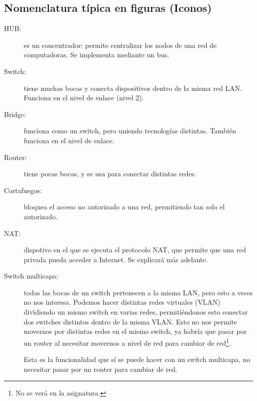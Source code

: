 \subsection{Nomenclatura típica en figuras (Iconos)}
\begin{description}
    \item[HUB:] es un concentrador: permite centralizar los nodos de una red de computadoras. Se implementa mediante un bus.
    \item[Switch:] tiene muchas bocas y conecta dispositivos dentro de la misma red \acrshort{LAN}. Funciona en el nivel de enlace (nivel 2).
    \item[Bridge:] funciona como un switch, pero uniendo tecnologías distintas. También funciona en el nivel de enlace.
    \item[Router:] tiene pocas bocas, y se usa para conectar distintas redes. 
    \item[Cortafuegos:] bloquea el acceso no autorizado a una red, permitiendo tan solo el autorizado. 
    \item[NAT:] dispotivo en el que se ejecuta el protocolo \acrfull{NAT}, que permite que una red privada pueda acceder a Internet. Se explicará más adelante.
    \item[Switch multicapa:] todas las bocas de un switch pertenecen a la misma \acrshort{LAN}, pero esto a veces no nos interesa. Podemos hacer distintas redes virtuales (\acrshort{VLAN}) dividiendo un mismo switch en varias redes, permitiéndonos esto conectar dos switches distintos dentro de la misma \acrshort{VLAN}. Esto no nos permite movernos por distintas redes en el mismo switch, ya habría que pasar por un router al necesitar movernos a nivel de red para cambiar de red\footnote{No se verá en la asignatura.}.
    
    Esta es la funcionalidad que sí se puede hacer con un switch multicapa, no necesitar pasar por un router para cambiar de red.
\end{description}

